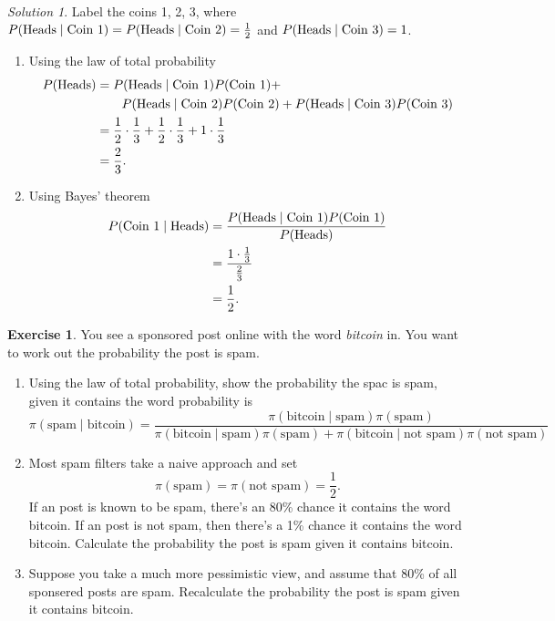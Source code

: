 \documentclass[
]{book}
\providecommand{\tightlist}{%
  \setlength{\itemsep}{0pt}\setlength{\parskip}{0pt}}
\theoremstyle{definition}
\theoremstyle{definition}
\theoremstyle{definition}
\newtheorem{exercise}{Exercise}[chapter]
\theoremstyle{definition}
\theoremstyle{remark}
\newtheorem*{solution}{Solution}
\begin{document}
\begin{solution}

Label the coins 1, 2, 3, where \(P(\hbox{Heads} \mid \hbox{Coin } 1) = P(\hbox{Heads} \mid \hbox{Coin } 2) = \frac{1}{2}\) and \(P(\hbox{Heads} \mid \hbox{Coin } 3) = 1\).

\begin{enumerate}
\def\labelenumi{\arabic{enumi}.}
\item
  Using the law of total probability
  \begin{align*}
  P(\hbox{Heads}) & = P(\hbox{Heads} \mid \hbox{Coin } 1) P(\hbox{Coin } 1) + \\
  & \qquad  P(\hbox{Heads} \mid \hbox{Coin } 2) P(\hbox{Coin } 2) + P(\hbox{Heads} \mid \hbox{Coin } 3) P(\hbox{Coin } 3) \\
  & = \frac{1}{2}\cdot\frac{1}{3} + \frac{1}{2}\cdot\frac{1}{3} + 1\cdot\frac{1}{3} \\
  & = \frac{2}{3}.
  \end{align*}
\item
  Using Bayes' theorem
  \begin{align*}
  P(\hbox{Coin 1}\mid \hbox{Heads}) &= \frac{P(\hbox{Heads} \mid \hbox{Coin 1})P(\hbox{Coin 1})}{P(\hbox{Heads})} \\
  & = \frac{1\cdot\frac{1}{3}}{\frac{2}{3}} \\
  & = \frac{1}{2}.
  \end{align*}
\end{enumerate}

\end{solution}

\begin{exercise}

You see a sponsored post online with the word \emph{bitcoin} in. You want to work out the probability the post is spam.

\begin{enumerate}
\def\labelenumi{\arabic{enumi}.}
\tightlist
\item
  Using the law of total probability, show the probability the spac is spam, given it contains the word probability is
  \[
    \pi(\textrm{spam} \mid \textrm{bitcoin}) = \frac{\pi(\textrm{bitcoin} \mid \textrm{spam})\pi(\textrm{spam})}{\pi(\textrm{bitcoin} \mid \textrm{spam})\pi(\textrm{spam}) + \pi(\textrm{bitcoin} \mid \textrm{not spam})\pi(\textrm{not spam})}
    \]
\item
  Most spam filters take a naive approach and set
  \[
    \pi(\textrm{spam}) =\pi(\textrm{not spam}) = \frac{1}{2}. 
    \]
  If an post is known to be spam, there's an 80\% chance it contains the word bitcoin. If an post is not spam, then there's a 1\% chance it contains the word bitcoin. Calculate the probability the post is spam given it contains bitcoin.
\item
  Suppose you take a much more pessimistic view, and assume that 80\% of all sponsered posts are spam. Recalculate the probability the post is spam given it contains bitcoin.
\end{enumerate}

\end{exercise}
\end{document}
